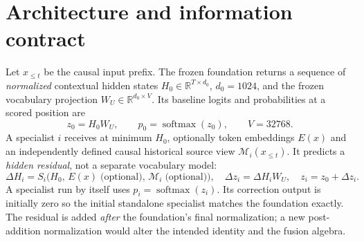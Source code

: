 \documentclass[11pt,letterpaper]{article}
\newcommand{\R}{\mathbb R}
\newcommand{\softmax}{\operatorname{softmax}}
\begin{document}
\section{Architecture and information contract}
\label{sec:architecture}
Let $x_{\le t}$ be the causal input prefix. The frozen foundation returns a sequence of \emph{normalized} contextual hidden states $H_0\in\R^{T\times d_0}$, $d_0=1024$, and the frozen vocabulary projection $W_U\in\R^{d_0\times V}$. Its baseline logits and probabilities at a scored position are
\begin{equation}
 z_0=H_0 W_U,\qquad p_0=\softmax(z_0),\qquad V=32768.
 \label{eq:foundation}
\end{equation}
A specialist $i$ receives at minimum $H_0$, optionally token embeddings $E(x)$ and an independently defined causal historical source view $\mathcal M_i(x_{\le t})$. It predicts a \emph{hidden residual}, not a separate vocabulary model:
\begin{equation}
 \Delta H_i=S_i\bigl(H_0,\,E(x)\;\text{(optional)},\,\mathcal M_i\;\text{(optional)}\bigr),\quad
 \Delta z_i=\Delta H_iW_U,\quad z_i=z_0+\Delta z_i.
 \label{eq:individual}
\end{equation}
A specialist run by itself uses $p_i=\softmax(z_i)$. Its correction output is initially zero so the initial standalone specialist matches the foundation exactly. The residual is added \emph{after} the foundation's final normalization; a new post-addition normalization would alter the intended identity and the fusion algebra.
\end{document}
